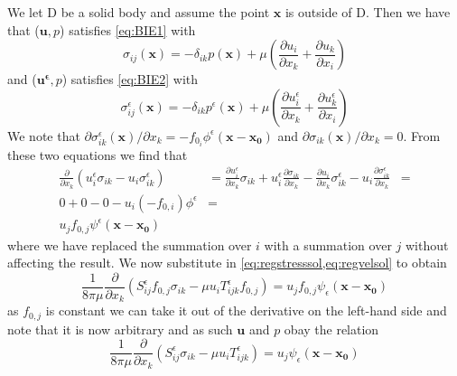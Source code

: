We let D be a solid body and assume the point $\mathbf{x}$ is outside of D. Then we have that ($\mathbf{u},p$) satisfies \cref{eq:BIE1} with
\begin{equation*}
\sigma_{ij}(\mathbf{x}) = -\delta_{ik}p(\mathbf{x}) + \mu\left( \frac{\partial u_i}{\partial x_k} + \frac{\partial u_k}{\partial x_i} \right)
\end{equation*}
and ($\mathbf{u^\epsilon},p$) satisfies \cref{eq:BIE2} with
\begin{equation*}
\sigma^\epsilon_{ij}(\mathbf{x}) = -\delta_{ik}p^\epsilon(\mathbf{x}) + \mu\left( \frac{\partial u^\epsilon_i}{\partial x_k} + \frac{\partial u^\epsilon_k}{\partial x_i} \right)
\end{equation*}
We note that $\partial \sigma^\epsilon_{ik}(\mathbf{x})/ \partial x_k = -f_{0_i}\phi^\epsilon(\mathbf{x}-\mathbf{x_0})$ and $\partial \sigma_{ik}(\mathbf{x})/ \partial x_k = 0$. From these two equations we find that
\begin{equation*}
\begin{aligned}
  \frac{\partial}{\partial x_k}(u^\epsilon_i\sigma_{ik} - u_i\sigma^\epsilon_{ik}) &=
  \frac{\partial u^\epsilon_i}{\partial x_k} \sigma_{ik} + u^\epsilon_i\frac{\partial \sigma_{ik}}{\partial x_k} - \frac{\partial u_i}{\partial x_k} \sigma^\epsilon_{ik} - u_i\frac{\partial \sigma^\epsilon_{ik}}{\partial x_k} &= \\
  0 + 0 - 0 - u_i(-f_{0,i})\phi^\epsilon &= \\
  u_j f_{0,j}\psi^\epsilon(\mathbf{x}-\mathbf{x_0})
\end{aligned}
\end{equation*}
where we have replaced the summation over $i$ with a summation over $j$ without affecting the result.
We now substitute in \cref{eq:regstresssol,eq:regvelsol} to obtain
\begin{equation*}
  \frac{1}{8\pi\mu}\frac{\partial}{\partial x_k}(S^\epsilon_{ij}f_{0,j}\sigma_{ik} - \mu u_i T^\epsilon_{ijk}f_{0,j}) = u_j f_{0,j}\psi_\epsilon(\mathbf{x}-\mathbf{x_0})
\end{equation*}
as $f_{0,j}$ is constant we can take it out of the derivative on the left-hand side and note that it is now arbitrary and as such $\mathbf{u}$ and $p$ obay the relation
\begin{equation}
  \label{eq:reciprocalrelation}
  \frac{1}{8\pi\mu}\frac{\partial}{\partial x_k}(S^\epsilon_{ij}\sigma_{ik} - \mu u_i T^\epsilon_{ijk}) = u_j\psi_\epsilon(\mathbf{x}-\mathbf{x_0})
\end{equation}
